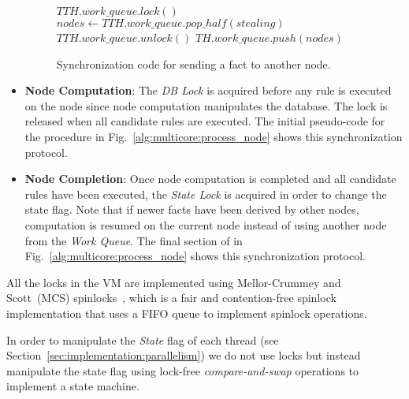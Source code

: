 \begin{itemize}
\begin{figure}
\begin{algorithm}[H]
   $TTH.work\_queue.lock()$\;
   $nodes \longleftarrow TTH.work\_queue.pop\_half(stealing)$\;
   $TTH.work\_queue.unlock()$\;
   $TH.work\_queue.push(nodes)$\;
\end{algorithm}
\caption{Synchronization code for sending a fact to another node.}
 \label{alg:multicore:steal_nodes}
\end{figure}

   \item \textbf{Node Computation}: The \emph{DB Lock} is acquired before any
      rule is executed on the node since node computation manipulates the
      database. The lock is released when all candidate rules are executed. The
      initial pseudo-code for the  procedure in
      Fig.~\ref{alg:multicore:process_node} shows this synchronization protocol.

   \item \textbf{Node Completion}: Once node computation is completed and all
      candidate rules have been executed, the \emph{State Lock} is acquired in
      order to change the state flag. Note that if newer facts have been derived
      by other nodes, computation is resumed on the current node instead of
      using another node from the \emph{Work Queue}. The final section of
       in Fig.~\ref{alg:multicore:process_node} shows this
      synchronization protocol.

\end{itemize}

All the locks in the VM are implemented using Mellor-Crummey and Scott~(MCS)
spinlocks~\cite{Mellor-Crummey:1991}, which is a fair and contention-free
spinlock implementation that uses a FIFO queue to implement spinlock operations.

In order to manipulate the \emph{State} flag of each thread (see
Section~\ref{sec:implementation:parallelism}) we do not use locks but instead
manipulate the state flag using lock-free \emph{compare-and-swap} operations to
implement a state machine.

